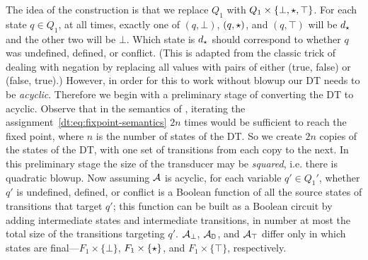The idea of the construction is that we replace $Q_1$ with $Q_1 \times \{\bot, \star,\top\}$. For each state $q \in Q_1$, at all times, exactly one of $(q, \bot)$, $(q, \star)$, and $(q, \top)$ will be $d_\star$ and the other two will be $\bot$. Which state is $d_\star$ should correspond to whether $q$ was undefined, defined, or conflict. (This is adapted from the classic trick of dealing with negation by replacing all values with pairs of either (true, false) or (false, true).) However, in order for this to work without blowup our DT needs to be \emph{acyclic}. Therefore we begin with a preliminary stage of converting the DT to acyclic. Observe that in the semantics of , iterating the assignment~\eqref{dt:eq:fixpoint-semantics} $2n$ times would be sufficient to reach the fixed point, where $n$ is the number of states of the DT. So we create $2n$ copies of the states of the DT, with one set of transitions from each copy to the next. In this preliminary stage the size of the transducer may be \emph{squared}, i.e. there is quadratic blowup. Now assuming $\mathcal{A}$ is acyclic, for each variable $q' \in Q_1'$, whether $q'$ is undefined, defined, or conflict is a Boolean function of all the source states of transitions that target $q'$; this function can be built as a Boolean circuit by adding intermediate states and intermediate transitions, in number at most the total size of the transitions targeting $q'$.
$\mathcal{A}_\bot$, $\mathcal{A}_{\mathbb{D}}$, and $\mathcal{A}_\top$ differ only in which states are final---$F_1 \times \{\bot\}$, $F_1 \times \{\star\}$, and $F_1 \times \{\top\}$, respectively.

%


